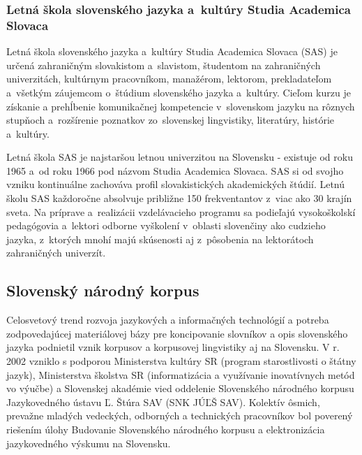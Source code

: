 \begin{multicols}{2}
\subsubsection{Letná škola slovenského jazyka a~kultúry Studia Academica Slovaca}
Letná škola slovenského jazyka a~kultúry Studia Academica Slovaca (SAS) je určená zahraničným slovakistom a~slavistom, študentom na zahraničných univerzitách, kultúrnym pracovníkom, manažérom, lektorom, prekladateľom a~všetkým záujemcom o~štúdium slovenského jazyka a~kultúry. Cieľom kurzu je získanie a prehĺbenie komunikačnej kompetencie v~slovenskom jazyku na rôznych stupňoch a~rozšírenie poznatkov zo~slovenskej lingvistiky, literatúry, histórie a~kultúry.

Letná škola SAS je najstaršou letnou univerzitou na Slovensku - existuje od roku 1965 a~od roku 1966 pod názvom Studia Academica Slovaca. SAS si od svojho vzniku kontinuálne zachováva profil slovakistických akademických štúdií. Letnú školu SAS každoročne absolvuje približne 150 frekventantov z~viac ako 30 krajín sveta. Na príprave a~realizácii vzdelávacieho programu sa podieľajú vysokoškolskí pedagógovia a~lektori odborne vyškolení v~oblasti slovenčiny ako cudzieho jazyka, z~ktorých mnohí majú skúsenosti aj z~pôsobenia na lektorátoch zahraničných univerzít.


\subsection{Slovenský národný korpus}
Celosvetový trend rozvoja jazykových a informačných
technológií a potreba zodpovedajúcej materiálovej bázy pre
koncipovanie slovníkov a opis slovenského jazyka podnietil vznik
korpusov a korpusovej lingvistiky aj na Slovensku. V r. 2002 vzniklo s
podporou Ministerstva kultúry SR (program starostlivosti o štátny
jazyk), Ministerstva školstva SR (informatizácia a využívanie
inovatívnych metód vo výučbe) a Slovenskej akadémie vied oddelenie
Slovenského národného korpusu Jazykovedného ústavu Ľ. Štúra SAV
(SNK JÚĽŠ SAV). Kolektív ôsmich, prevažne mladých vedeckých,
odborných a technických pracovníkov bol poverený riešením úlohy
Budovanie Slovenského národného korpusu a elektronizácia
jazykovedného výskumu na Slovensku\cite{simkova2006b}.


\end{multicols}
